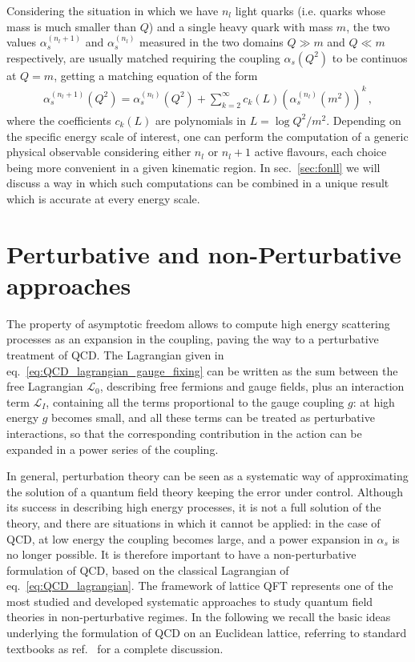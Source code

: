 %
Considering the situation in which we have $n_l$ light quarks (i.e. quarks whose mass is much smaller than $Q$)
and a single heavy quark with mass $m$, the two values $\alpha_s^{(n_l+1)}$ and $\alpha_s^{(n_l)}$ 
measured in the two domains $Q \gg m$ and $Q \ll m$ respectively,
are usually matched requiring  the coupling $\alpha_s\left(Q^2\right)$
to be continuos at $Q=m$, getting a matching equation of the form
\begin{align}
    \alpha_s^{(n_l+1)}\left(Q^2\right) = 
    \alpha_s^{(n_l)}\left(Q^2\right) 
    + \sum_{k=2}^{\infty} c_k\left(L\right) \left(\alpha_s^{(n_l)}\left(m^2\right)\right)^k\,,
\end{align}
where the coefficients $c_k\left(L\right)$ are  polynomials in $L=\log Q^2/m^2$.
Depending on the specific energy scale of interest,
one can perform the computation of a generic physical observable considering either $n_l$ or $n_l + 1$ active flavours,
each choice being more convenient in a given kinematic region. 
In sec.~\ref{sec:fonll} we will discuss a way in which such computations can be combined in a unique result which
is accurate at every energy scale.

\section{Perturbative and non-Perturbative approaches}
The property of asymptotic freedom allows to compute high energy scattering processes as
an expansion in the coupling, paving the way to a perturbative treatment of QCD.
The Lagrangian given in eq.~\eqref{eq:QCD_lagrangian_gauge_fixing}
can be written as the sum between the free Lagrangian $\mathcal{L}_0$, describing free fermions and gauge fields, 
plus an interaction term $\mathcal{L}_I$, containing all the terms proportional to the gauge coupling $g$:
at high energy $g$ becomes small, and all these terms 
can be treated as perturbative interactions, so that the corresponding
contribution in the action can be expanded in a power series of the coupling.

%
In general, perturbation theory can be seen as a systematic way of approximating the solution 
of a quantum field theory keeping the error under control.
Although its success in describing high energy processes, it is not a full solution of the theory, 
and there are situations in which it cannot be applied: in the case of QCD, at low energy the coupling
becomes large, and a power expansion in $\alpha_s$ is no longer possible. 
It is therefore important to have a non-perturbative formulation of QCD, based on the classical Lagrangian 
of eq.~\eqref{eq:QCD_lagrangian}.
The framework of lattice QFT represents one of the most studied and developed systematic approaches to study quantum
field theories in non-perturbative regimes. In the following we recall the basic ideas underlying the formulation of 
QCD on an Euclidean lattice, referring to standard textbooks as ref.~\cite{smit_2002} for a complete discussion.


